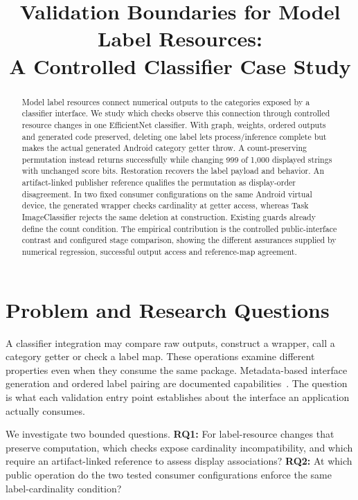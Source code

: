 \documentclass[10pt,conference]{IEEEtran}
\title{Validation Boundaries for Model Label Resources:\\A Controlled Classifier Case Study}
\author{\IEEEauthorblockN{Anonymous author(s)}}
\begin{document}
\maketitle

\begin{abstract}
Model label resources connect numerical outputs to the categories exposed by a classifier interface. We study which checks observe this connection through controlled resource changes in one EfficientNet classifier. With graph, weights, ordered outputs and generated code preserved, deleting one label lets process/inference complete but makes the actual generated Android category getter throw. A count-preserving permutation instead returns successfully while changing 999 of 1,000 displayed strings with unchanged score bits. Restoration recovers the label payload and behavior. An artifact-linked publisher reference qualifies the permutation as display-order disagreement. In two fixed consumer configurations on the same Android virtual device, the generated wrapper checks cardinality at getter access, whereas Task ImageClassifier rejects the same deletion at construction. Existing guards already define the count condition. The empirical contribution is the controlled public-interface contrast and configured stage comparison, showing the different assurances supplied by numerical regression, successful output access and reference-map agreement.
\end{abstract}

\section{Problem and Research Questions}
\label{sec:contracts}
A classifier integration may compare raw outputs, construct a wrapper, call a category getter or check a label map. These operations examine different properties even when they consume the same package. Metadata-based interface generation and ordered label pairing are documented capabilities~\cite{schema,codegen-doc,tensorlabel}. The question is what each validation entry point establishes about the interface an application actually consumes.

We investigate two bounded questions. \textbf{RQ1:} For label-resource changes that preserve computation, which checks expose cardinality incompatibility, and which require an artifact-linked reference to assess display associations? \textbf{RQ2:} At which public operation do the two tested consumer configurations enforce the same label-cardinality condition?
\end{document}
